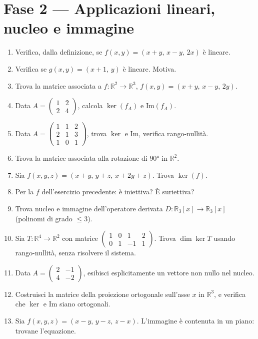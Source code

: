 \documentclass[a4paper,11pt]{article}
\begin{document}
\section{Fase 2 --- Applicazioni lineari, nucleo e immagine}
\begin{enumerate}
  \item Verifica, dalla definizione, se $f(x,y)=(x+y,\,x-y,\,2x)$ è lineare.
  \item Verifica se $g(x,y)=(x+1,\,y)$ è lineare. Motiva.
  \item Trova la matrice associata a $f:\mathbb R^2\to\mathbb R^3$, $f(x,y)=(x+y,\,x-y,\,2y)$.
  \item Data $A=\begin{pmatrix}1&2\\2&4\end{pmatrix}$, calcola $\ker(f_A)$ e $\mathrm{Im}(f_A)$.
  \item Data $A=\begin{pmatrix}1&1&2\\2&1&3\\1&0&1\end{pmatrix}$, trova $\ker$ e $\mathrm{Im}$, verifica rango-nullità.
  \item Trova la matrice associata alla rotazione di $90°$ in $\mathbb R^2$.
  \item Sia $f(x,y,z)=(x+y,\,y+z,\,x+2y+z)$. Trova $\ker(f)$.
  \item Per la $f$ dell'esercizio precedente: è iniettiva? È suriettiva?
  \item Trova nucleo e immagine dell'operatore derivata $D:\mathbb R_3[x]\to\mathbb R_3[x]$ (polinomi di grado $\le3$).
  \item Sia $T:\mathbb R^4\to\mathbb R^2$ con matrice $\begin{pmatrix}1&0&1&2\\0&1&-1&1\end{pmatrix}$. Trova $\dim\ker T$ usando rango-nullità, senza risolvere il sistema.
  \item Data $A=\begin{pmatrix}2&-1\\4&-2\end{pmatrix}$, esibisci esplicitamente un vettore non nullo nel nucleo.
  \item Costruisci la matrice della proiezione ortogonale sull'asse $x$ in $\mathbb R^3$, e verifica che $\ker$ e $\mathrm{Im}$ siano ortogonali.
  \item Sia $f(x,y,z)=(x-y,\,y-z,\,z-x)$. L'immagine è contenuta in un piano: trovane l'equazione.

\end{enumerate}
\end{document}
